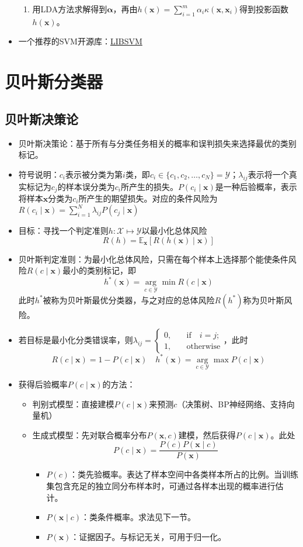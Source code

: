 \documentclass{ctexart}
\begin{document}
\begin{itemize}
\begin{enumerate}
						\item 用LDA方法求解得到$\bm{\alpha}$，再由$h(\bm{x})=\sum_{i=1}^{m}\alpha_i\kappa(\bm{x},\bm{x}_i)$得到投影函数$h(\bm{x})$。
					\end{enumerate}
					\item 一个推荐的SVM开源库：\href{https://www.csie.ntu.edu.tw/~cjlin/libsvm/}{LIBSVM}
					\end{itemize}
			\section{贝叶斯分类器}
				\subsection{贝叶斯决策论}
					\begin{itemize}
						\item 贝叶斯决策论：基于所有与分类任务相关的概率和误判损失来选择最优的类别标记。
						\item 符号说明：$c_i$表示被分类为第$i$类，即$c_i\in\{c_1,c_2,\dots,c_N\}=\mathcal{Y}$；$\lambda_{ij}$表示将一个真实标记为$c_j$的样本误分类为$c_i$所产生的损失。$P(c_i\mid\bm{x})$是一种后验概率，表示将样本$\bm{x}$分类为$c_i$所产生的期望损失。对应的条件风险为$R(c_i\mid\bm{x})=\sum_{i=1}^{N}\lambda_{ij}P(c_j\mid\bm{x})$
						\item 目标：寻找一个判定准则$h:\mathcal{X}\mapsto\mathcal{Y}$以最小化总体风险\[R(h)=\mathbb{E}_{\bm{x}}[R(h(\bm{x})\mid\bm{x})]\]
						\item 贝叶斯判定准则：为最小化总体风险，只需在每个样本上选择那个能使条件风险$R(c\mid\bm{x})$最小的类别标记，即\[h^*(\bm{x})=\arg\limits_{c\in\mathcal{Y}}\min R(c\mid\bm{x})\]此时$h^*$被称为贝叶斯最优分类器，与之对应的总体风险$R(h^*)$称为贝叶斯风险。
						\item 若目标是最小化分类错误率，则$\lambda_{ij}=\left\{\begin{aligned}
						0,\quad & \mathrm{if}\quad i=j;\\
						1,\quad & \mathrm{otherwise}
						\end{aligned}\right.$，此时\[R(c\mid\bm{x})=1-P(c\mid\bm{x})\quad h^*(\bm{x})=\arg\limits_{c\in\mathcal{Y}}\max P(c\mid\bm{x})\]
						 \item 获得后验概率$P(c\mid\bm{x})$的方法：\begin{itemize}
						 	\item 判别式模型：直接建模$P(c\mid\bm{x})$来预测$c$（决策树、BP神经网络、支持向量机）
						 	\item 生成式模型：先对联合概率分布$P(\bm{x},c)$建模，然后获得$P(c\mid\bm{x})$。此处\[P(c\mid\bm{x})=\frac{P(c)P(\bm{x}\mid c)}{P(\bm{x})}\]\begin{itemize}
						 		\item $P(c)$：类先验概率。表达了样本空间中各类样本所占的比例。当训练集包含充足的独立同分布样本时，可通过各样本出现的概率进行估计。
						 		\item $P(\bm{x}\mid c)$：类条件概率。求法见下一节。
						 		\item $P(\bm{x})$：证据因子。与标记无关，可用于归一化。
						 	\end{itemize}
						 \end{itemize}
					\end{itemize}
\end{document}
